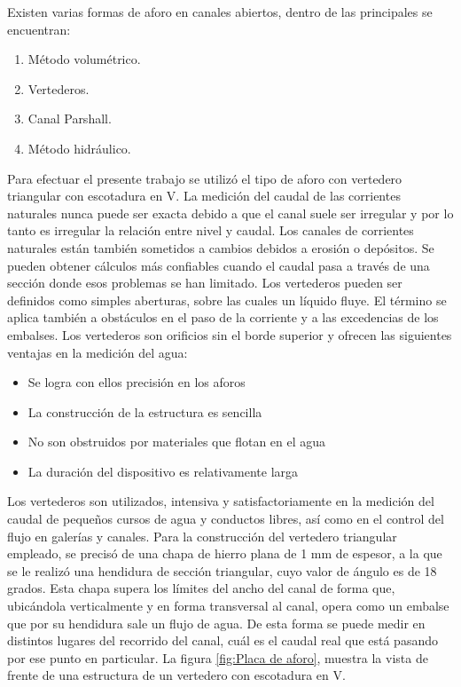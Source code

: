 \vspace{1cm}
Existen varias formas de aforo en canales abiertos, dentro de las principales se encuentran:
\begin{enumerate}
	\item Método volumétrico.
	\item Vertederos.
	\item Canal Parshall. 
	\item Método hidráulico.
\end{enumerate}
Para efectuar el presente trabajo se utilizó el tipo de aforo con vertedero triangular con escotadura en V.
La medición del caudal de las corrientes naturales nunca puede ser exacta debido a que el canal suele ser irregular y por lo tanto es irregular la relación entre nivel y caudal. Los canales de corrientes naturales están también sometidos a cambios debidos a erosión o depósitos. Se pueden obtener cálculos más confiables cuando el caudal pasa a través de una sección donde esos problemas se han limitado. Los vertederos pueden ser definidos como simples aberturas, sobre las cuales un líquido fluye. El término se aplica también a obstáculos en el paso de la corriente y a las excedencias de los embalses. Los vertederos son orificios sin el borde superior y ofrecen las siguientes ventajas en la medición del agua: 

\begin{itemize}
\item Se logra con ellos precisión en los aforos 	
\item La construcción de la estructura es sencilla
\item No son obstruidos por materiales que flotan en el agua 
\item La duración del dispositivo es relativamente larga
\end{itemize}
Los vertederos son utilizados, intensiva y satisfactoriamente en la medición del caudal de pequeños cursos de agua y conductos libres, así como en el control del flujo en galerías y canales.
Para la construcción del vertedero triangular empleado, se precisó de una chapa de hierro plana de 1 mm de espesor, a la que se le  realizó una hendidura de sección triangular, cuyo  valor de ángulo es de 18 grados.
Esta chapa supera los límites del ancho del canal de forma que, ubicándola  verticalmente y en forma transversal al canal, opera como un embalse que por su hendidura sale un flujo de agua.
De esta forma se puede medir en distintos lugares del recorrido del canal, cuál es el caudal real que está pasando por ese punto en particular.  
La figura \ref{fig:Placa de aforo},  muestra la vista de frente de una estructura de un vertedero con escotadura en V. 	

